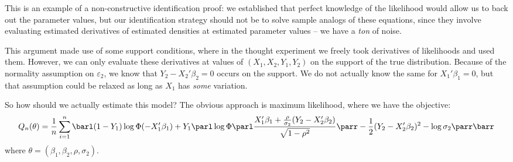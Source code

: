 \documentclass[10pt]{article}
\begin{document}
\begin{example}
	\begin{remark}
		This is an example of a non-constructive identification proof: we established that perfect knowledge of the likelihood would allow us to back out the parameter values, but our identification strategy should not be to solve sample analogs of these equations, since they involve evaluating estimated derivatives of estimated densities at estimated parameter values -- we have a \emph{ton} of noise. 
	\end{remark}
	\begin{remark}
		This argument made use of some support conditions, where in the thought experiment we freely took derivatives of likelihoods and used them. However, we can only evaluate these derivatives at values of $(X_1,X_2,Y_1,Y_2)$ on the support of the true distribution. Because of the normality assumption on $\varepsilon_2$, we know that $Y_2 - X_2'\beta_2 = 0$ occurs on the support. We do not actually know the same for $X_1'\beta_1=0$, but that assumption could be relaxed as long as $X_1$ has \emph{some} variation. 
	\end{remark}
	
	So how should we actually estimate this model? The obvious approach is maximum likelihood, where we have the objective:
	\[
	Q_n(\theta) = \frac{1}{n}\sum_{i=1}^n \barl (1-Y_1) \log \Phi (-X_1'\beta_1) + Y_1 \parl \log \Phi \parl \frac{X_1'\beta_1+ \frac{\rho}{\sigma_2}(Y_2 - X_2'\beta_2)}{\sqrt{1-\rho^2}}\parr - \frac{1}{2} (Y_2 - X_2'\beta_2)^2 - \log \sigma_2 \parr \barr
	\]
	where $\theta = (\beta_1,\beta_2,\rho,\sigma_2)$. 
\end{example}
\end{document}
